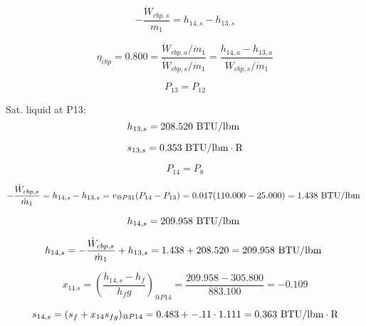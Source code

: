 \documentclass{article}
\begin{document}
\begin{equation}
-\frac{\dot{W}_{cbp,s}}{m_1} = h_{14,s} - h_{13,s}\end{equation}

\begin{equation}
\eta_{cbp} =    0.800 = \frac{\dot{W}_{cbp,a} / \dot{m}_{1}}{\dot{W}_{cbp,s} / \dot{m}_{1}} = \frac{
h_{14,a} - h_{13,a}}{\dot{W}_{cbp,s} / \dot{m}_{1}}
\end{equation}

\begin{equation}
P_{13} = P_{12}
\end{equation}

Sat. liquid at P13:
\begin{equation}
  h_{13,s} =  208.520\textnormal{ BTU/lbm                   }
\end{equation}

\begin{equation}
  s_{13,s} =    0.353\textnormal{ BTU/lbm}\cdot\textnormal{R}
\end{equation}

\begin{equation}
P_{14} = P_{ 8}
\end{equation}

\begin{equation}
-\frac{\dot{W}_{cbp,s}}{\dot{m}_{ 1}} = h_{14,s} - h_{13,s} = v_{@P31}(P_{14} - P_{13}) =    0.017( 110.000 -   25.000) =    1.438\textnormal{ BTU/lbm                   }
\end{equation}

\begin{equation}
  h_{14,s} =  209.958\textnormal{ BTU/lbm                   }
\end{equation}

\begin{equation}
h_{14,s} = -\frac{\dot{W}_{cbp,s}}{\dot{m}_{1}} + h_{13,s} =    1.438 +  208.520 =  209.958\textnormal{ BTU/lbm                   }
\end{equation}

\begin{equation}
x_{14.s} = (\frac{h_{14,s} - h_{f}}{h_fg})_{@P14} = \frac{ 209.958 -  305.800}{ 883.100} =   -0.109
\end{equation}

\begin{equation}
  s_{14,s} = (s_{f} + x_{14}s_{fg})_{@P14} =    0.483 + -.11\cdot   1.111 =    0.363
\textnormal{ BTU/lbm}\cdot\textnormal{R}
\end{equation}
\end{document}
